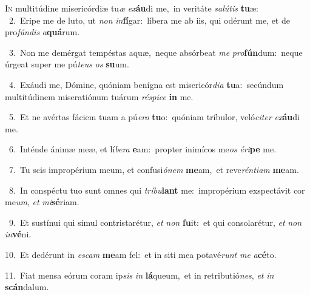 \lettrine{\initial\textcolor{\initialcolor}{I}}{n} multitúdine misericórdiæ tu\textit{æ} \textit{ex}\-\textbf{áu}di me,~\star in veritáte \textit{sa}\-\textit{lú}\textit{tis} \textbf{tu}\-æ:\\
{\numbfont\textcolor{\numbcolor}{~2.}}~Eripe me de luto, ut \textit{non} \textit{in}\-\textbf{fí}gar:~\star líbera me ab iis, qui odérunt me, et de pro\-\textit{fún}\-\textit{dis} \textit{a}\-\textbf{quá}rum.\par
{\numbfont\textcolor{\numbcolor}{~3.}}~Non me demérgat tempéstas aquæ,~\dagger neque absórbeat \textit{me} \textit{pro}\-\textbf{fún}dum:~\star neque úrgeat super me pú\-\textit{te}\-\textit{us} \textit{os} \textbf{su}\-um.\par
{\numbfont\textcolor{\numbcolor}{~4.}}~Exáudi me, Dómine, quóniam benígna est misericór\-\textit{di}\-\textit{a} \textbf{tu}\-a:~\star secúndum multitúdinem miseratiónum tuárum \textit{ré}\-\textit{spi}\textit{ce} \textbf{in} me.\par
{\numbfont\textcolor{\numbcolor}{~5.}}~Et ne avértas fáciem tuam a pú\-\textit{e}\-\textit{ro} \textbf{tu}\-o:~\star quóniam tríbulor, veló\-\textit{ci}\-\textit{ter} \textit{ex}\-\textbf{áu}di me.\par
{\numbfont\textcolor{\numbcolor}{~6.}}~Inténde ánimæ meæ, et lí\-\textit{be}\-\textit{ra} \textbf{e}\-am:~\star propter inimícos me\textit{os} \textit{é}\-\textit{ri}\textbf{pe} me.\par
{\numbfont\textcolor{\numbcolor}{~7.}}~Tu scis impropérium meum, et confusi\-\textit{ó}\-\textit{nem} \textbf{me}\-am,~\star et reve\-\textit{rén}\-\textit{ti}\textit{am} \textbf{me}\-am.\par
{\numbfont\textcolor{\numbcolor}{~8.}}~In conspéctu tuo sunt omnes qui \textit{trí}\-\textit{bu}\textbf{lant} me:~\star impropérium exspectávit cor me\-\textit{um}\-, \textit{et} \textit{mi}\-\textbf{sé}riam.\par
{\numbfont\textcolor{\numbcolor}{~9.}}~Et sustínui qui simul contristarétur, \textit{et} \textit{non} \textbf{fu}\-it:~\star et qui consolarétur, \textit{et} \textit{non} \textit{in}\-\textbf{vé}ni.\par
{\numbfont\textcolor{\numbcolor}{10.}}~Et dedérunt in \textit{es}\-\textit{cam} \textbf{me}\-am fel:~\star et in siti mea potavé\textit{runt} \textit{me} \textit{a}\-\textbf{cé}to.\par
{\numbfont\textcolor{\numbcolor}{11.}}~Fiat mensa eórum coram ip\textit{sis} \textit{in} \textbf{lá}\-queum,~\star et in retributió\-\textit{nes}\-, \textit{et} \textit{in} \textbf{scán}\-dalum.\par
